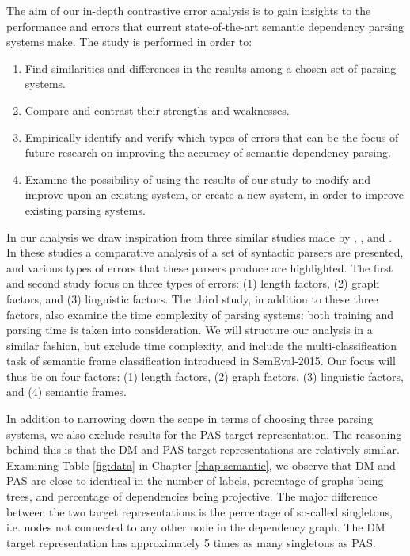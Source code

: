 The aim of our in-depth contrastive error analysis is to gain insights to the performance and errors that current state-of-the-art semantic dependency parsing systems make. The study is performed in order to:

\begin{enumerate}
    \item Find similarities and differences in the results among a chosen set of parsing systems.
    \item Compare and contrast their strengths and weaknesses.
    \item Empirically identify and verify which types of errors that can be the focus of future research on improving the accuracy of semantic dependency parsing.
    \item Examine the possibility of using the results of our study to modify and improve upon an existing system, or create a new system, in order to improve existing parsing systems.
\end{enumerate}


In our analysis we draw inspiration from three similar studies made by , , and . In these studies a comparative analysis of a set of syntactic parsers are presented, and various types of errors that these parsers produce are highlighted. The first and second study focus on three types of errors: (1) length factors, (2) graph factors, and (3) linguistic factors. The third study, in addition to these three factors, also examine the time complexity of parsing systems: both training and parsing time is taken into consideration. We will structure our analysis in a similar fashion, but exclude time complexity, and include the multi-classification task of semantic frame classification introduced in SemEval-2015. Our focus will thus be on four factors: (1) length factors, (2) graph factors, (3) linguistic factors, and (4) semantic frames.

In addition to narrowing down the scope in terms of choosing three parsing systems, we also exclude results for the PAS target representation. The reasoning behind this is that the DM and PAS target representations are relatively similar. Examining Table \ref{fig:data} in Chapter \ref{chap:semantic}, we observe that DM and PAS are close to identical in the number of labels, percentage of graphs being trees, and percentage of dependencies being projective. The major difference between the two target representations is the percentage of so-called singletons, i.e. nodes not connected to any other node in the dependency graph. The DM target representation has approximately 5 times as many singletons as PAS. 

